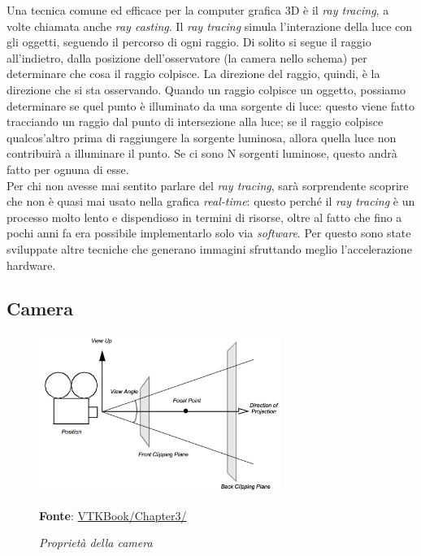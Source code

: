 Una tecnica comune ed efficace per la computer grafica 3D è il \emph{ray tracing}, a volte chiamata anche \emph{ray casting}. Il \emph{ray tracing} simula l'interazione della luce con gli oggetti, seguendo il percorso di ogni raggio. Di solito si segue il raggio all'indietro, dalla posizione dell'osservatore (la camera nello schema) per determinare che cosa il raggio colpisce. La direzione del raggio, quindi, è la direzione che si sta osservando. Quando un raggio colpisce un oggetto, possiamo determinare se quel punto è illuminato da una sorgente di luce: questo viene fatto tracciando un raggio dal punto di intersezione alla luce; se il raggio colpisce qualcos'altro prima di raggiungere la sorgente luminosa, allora quella luce non contribuirà a illuminare il punto. Se ci sono N sorgenti luminose, questo andrà fatto per ognuna di esse.
\\
Per chi non avesse mai sentito parlare del \emph{ray tracing}, sarà sorprendente scoprire che non è quasi mai usato nella grafica \emph{real-time}: questo perché il \emph{ray tracing} è un processo molto lento e dispendioso in termini di risorse, oltre al fatto che fino a pochi anni fa era possibile implementarlo solo via \emph{software}. Per questo sono state sviluppate altre tecniche che generano immagini sfruttando meglio l'accelerazione hardware.

\subsection{Camera}
\begin{figure}[h]
    \centering
    \includegraphics[width=0.7\textwidth]{immagini/volumerendering/camera.png}
    \caption{\textit{Proprietà della camera}}
    \textbf{Fonte}: \href{https://lorensen.github.io/VTKExamples/site/VTKBook/03Chapter3/}{VTKBook/Chapter3/}
    \label{fig: Proprietà Camera}
\end{figure}

